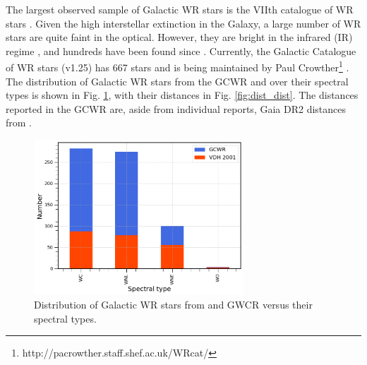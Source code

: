 The largest observed sample of Galactic WR stars is the VIIth catalogue of WR stars \citep[][henceforth ]{van_der_hucht_viith_2001}. Given the high interstellar extinction in the Galaxy, a large number of WR stars are quite faint in the optical. However, they are bright in the infrared (IR) regime \citep{rosslowe_spatial_2015}, and hundreds have been found since \citep{mauerhan_12_2009,shara_near-infrared_2009,shara_near-infrared_2012,faherty_characterizing_2014,rosslowe_deep_2018}. Currently, the Galactic Catalogue of WR stars (v1.25) has 667 stars and is being maintained by Paul Crowther\footnote{http://pacrowther.staff.shef.ac.uk/WRcat/} \citep[][henceforth GCWR]{rosslowe_spatial_2015,rate_unlocking_2020}. The distribution of Galactic WR stars from the GCWR and  over their spectral types is shown in Fig. \ref{fig:dist_spt}, with their distances in Fig. \ref{fig:dist_dist}. The distances reported in the GCWR are, aside from individual reports, Gaia DR2 distances from \citet{rate_unlocking_2020}. 

\begin{figure}
    \centering
    \includegraphics[width=0.7\textwidth]{chapters/introduction/image/spt_dist.png}
    \caption{Distribution of Galactic WR stars from  and GWCR versus their spectral types.}
    \label{fig:dist_spt}
\end{figure}


